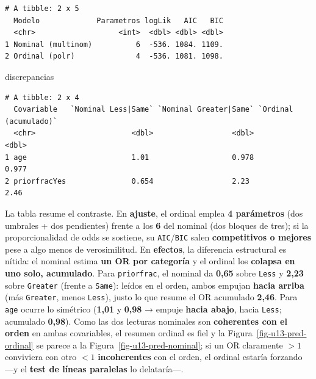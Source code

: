 \documentclass[
  letterpaper,
  DIV=11,
  numbers=noendperiod]{scrartcl}
\newenvironment{Shaded}{\begin{snugshade}}{\end{snugshade}}
\newcommand{\NormalTok}[1]{\textcolor[rgb]{0.00,0.23,0.31}{#1}}
\begin{document}
\begin{verbatim}
# A tibble: 2 x 5
  Modelo             Parametros logLik   AIC   BIC
  <chr>                   <int>  <dbl> <dbl> <dbl>
1 Nominal (multinom)          6  -536. 1084. 1109.
2 Ordinal (polr)              4  -536. 1081. 1098.
\end{verbatim}

\begin{Shaded}
\begin{Highlighting}[]
\NormalTok{discrepancias}
\end{Highlighting}
\end{Shaded}

\begin{verbatim}
# A tibble: 2 x 4
  Covariable   `Nominal Less|Same` `Nominal Greater|Same` `Ordinal (acumulado)`
  <chr>                      <dbl>                  <dbl>                 <dbl>
1 age                        1.01                   0.978                 0.977
2 priorfracYes               0.654                  2.23                  2.46 
\end{verbatim}

La tabla resume el contraste. En \textbf{ajuste}, el ordinal emplea
\textbf{4 parámetros} (dos umbrales + dos pendientes) frente a los
\textbf{6} del nominal (dos bloques de tres); si la proporcionalidad de
odds se sostiene, su \texttt{AIC}/\texttt{BIC} salen
\textbf{competitivos o mejores} pese a algo menos de verosimilitud. En
\textbf{efectos}, la diferencia estructural es nítida: el nominal estima
\textbf{un OR por categoría} y el ordinal los \textbf{colapsa en uno
solo, acumulado}. Para \texttt{priorfrac}, el nominal da \textbf{0,65}
sobre \texttt{Less} y \textbf{2,23} sobre \texttt{Greater} (frente a
\texttt{Same}): leídos en el orden, ambos empujan \textbf{hacia arriba}
(más \texttt{Greater}, menos \texttt{Less}), justo lo que resume el OR
acumulado \textbf{2,46}. Para \texttt{age} ocurre lo simétrico
(\textbf{1,01} y \textbf{0,98} → empuje \textbf{hacia abajo}, hacia
\texttt{Less}; acumulado \textbf{0,98}). Como las dos lecturas nominales
son \textbf{coherentes con el orden} en ambas covariables, el resumen
ordinal es fiel y la Figura~\ref{fig-u13-pred-ordinal} se parece a la
Figura~\ref{fig-u13-pred-nominal}; si un OR claramente \(>1\) conviviera
con otro \(<1\) \textbf{incoherentes} con el orden, el ordinal estaría
forzando ---y el \textbf{test de líneas paralelas} lo delataría---.
\end{document}
